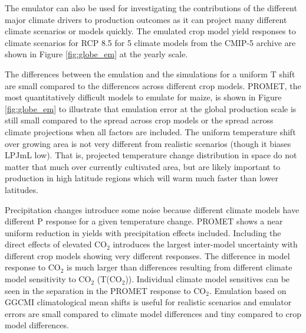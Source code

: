 \documentclass[gmd, manuscript]{copernicus} %
\begin{document}
The emulator can also be used for investigating the contributions of the different major climate drivers to production outcomes as it can project many different climate scenarios or models quickly.
The emulated crop model yield responses to climate scenarios for RCP 8.5 for 5 climate models from the CMIP-5 archive \citep{Taylor2012} are shown in Figure \ref{fig:globe_em} at the yearly scale. 

The differences between the emulation and the simulations for a uniform T shift are small compared to the differences across different crop models.
PROMET, the most quantitatively difficult models to emulate for maize, is shown in Figure \ref{fig:globe_em} to illustrate that emulation error at the global production scale is still small compared to the spread across crop models or the spread across climate projections when all factors are included.
The uniform temperature shift over growing area is not very different from realistic scenarios (though it biases LPJmL low). 
That is, projected temperature change distribution in space do not matter that much over currently cultivated area, but are likely important to production in high latitude regions which will warm much faster than lower latitudes.

Precipitation changes introduce some noise because different climate models have different P response for a given temperature change. 
PROMET shows a near uniform reduction in yields with precipitation effects included.
Including the direct effects of elevated CO$_2$ introduces the largest inter-model uncertainty with different crop models showing very different responses. 
The difference in model response to CO$_2$ is much larger than differences resulting from different climate model sensitivity to CO$_2$ (T(CO$_2$)).
Individual climate model sensitives can be seen in the separation in the PROMET response to CO$_2$.
Emulation based on GGCMI climatological mean shifts is useful for realistic scenarios and emulator errors are small compared to climate model differences and tiny compared to crop model differences.

\end{document}
